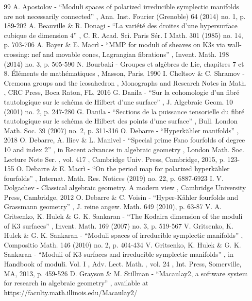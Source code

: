 \documentclass[11pt]{article}
\theoremstyle{definition}
\begin{document}
\begin{thebibliography}{99}
 A. Apostolov - “Moduli spaces of polarized irreducible symplectic manifolds are not necessarily connected” , Ann. Inst. Fourier (Grenoble) 64 (2014) no. 1, p. 189-202
 A. Beauville \& R. Donagi - “La variété des droites d’une hypersurface cubique de dimension $4$” , C. R. Acad. Sci. Paris Sér. I Math. 301 (1985) no. 14, p. 703-706
 A. Bayer \& E. Macrì - “MMP for moduli of sheaves on K3s via wall-crossing: nef and movable cones, Lagrangian fibrations” , Invent. Math. 198 (2014) no. 3, p. 505-590
 N. Bourbaki - Groupes et algèbres de Lie, chapitres 7 et 8. Éléments de mathématiques , Masson, Paris, 1990
 I. Cheltsov \& C. Shramov - Cremona groups and the icosahedron , Monographs and Research Notes in Math. , CRC Press, Boca Raton, FL, 2016
 G. Danila - “Sur la cohomologie d’un fibré tautologique sur le schéma de Hilbert d’une surface” , J. Algebraic Geom. 10 (2001) no. 2, p. 247-280
 G. Danila - “Sections de la puissance tensorielle du fibré tautologique sur le schéma de Hilbert des points d’une surface” , Bull. London Math. Soc. 39 (2007) no. 2, p. 311-316
 O. Debarre - “Hyperkähler manifolds” , 2018
 O. Debarre, A. Iliev \& L. Manivel - “Special prime Fano fourfolds of degree 10 and index 2” , in Recent advances in algebraic geometry , London Math. Soc. Lecture Note Ser. , vol. 417 , Cambridge Univ. Press, Cambridge, 2015, p. 123-155
 O. Debarre \& E. Macrì - “On the period map for polarized hyperkähler fourfolds” , Internat. Math. Res. Notices (2019) no. 22, p. 6887-6923
 I. V. Dolgachev - Classical algebraic geometry. A modern view , Cambridge University Press, Cambridge, 2012
 O. Debarre \& C. Voisin - “Hyper-Kähler fourfolds and Grassmann geometry” , J. reine angew. Math. 649 (2010), p. 63-87
 V. A. Gritsenko, K. Hulek \& G. K. Sankaran - “The Kodaira dimension of the moduli of K3 surfaces” , Invent. Math. 169 (2007) no. 3, p. 519-567
 V. Gritsenko, K. Hulek \& G. K. Sankaran - “Moduli spaces of irreducible symplectic manifolds” , Compositio Math. 146 (2010) no. 2, p. 404-434
 V. Gritsenko, K. Hulek \& G. K. Sankaran - “Moduli of K3 surfaces and irreducible symplectic manifolds” , in Handbook of moduli. Vol. I , Adv. Lect. Math. , vol. 24 , Int. Press, Somerville, MA, 2013, p. 459-526
 D. Grayson \& M. Stillman - “Macaulay2, a software system for research in algebraic geometry” , available at https://faculty.math.illinois.edu/Macaulay2/

\end{thebibliography}
\end{document}
